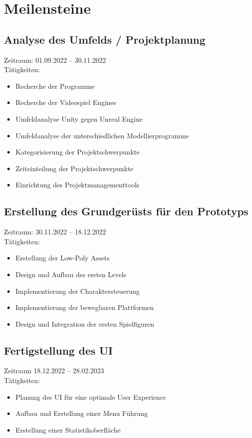 \pagebreak

\section{Meilensteine}
\subsection{Analyse des Umfelds / Projektplanung}
Zeitraum: 01.09.2022 – 30.11.2022\\
Tätigkeiten:
\begin{itemize}
    \item Recherche der Programme
    \item Recherche der Videospiel Engines
    \item Umfeldanalyse Unity gegen Unreal Engine
    \item Umfeldanalyse der unterschiedlichen Modellierprogramme
    \item Kategorisierung der Projektschwerpunkte
    \item Zeiteinteilung der Projektschwerpunkte
    \item Einrichtung des Projektmanagementtools 
\end{itemize}

\subsection{Erstellung des Grundgerüsts für den Prototyps}
Zeitraum: 30.11.2022 – 18.12.2022\\
Tätigkeiten:
\begin{itemize}
    \item Erstellung der Low-Poly Assets
    \item Design und Aufbau des ersten Levels 
    \item Implementierung der Charaktersteuerung
    \item Implementierung der bewegbaren Plattformen
    \item Design und Integration der ersten Spielfiguren
\end{itemize}

\subsection{Fertigstellung des UI}
Zeitraum 18.12.2022 – 28.02.2023\\ 
Tätigkeiten:
\begin{itemize}
    \item Planung des UI für eine optimale User Experience
    \item Aufbau und Erstellung einer Menu Führung
    \item Erstellung einer Statistikoberfläche
\end{itemize}

